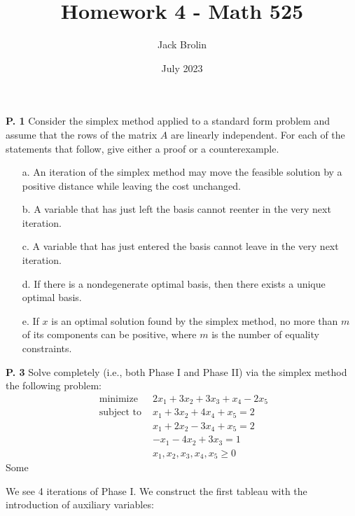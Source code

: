 \documentclass{article}
\title{Homework 4 - Math 525}
\author{Jack Brolin}
\date{July 2023}
\begin{document}
\maketitle

\begin{jacklist}
    \begin{framed} 
    \item [\textbf{P. 1}] Consider the simplex method applied to a standard form problem and assume that the rows of the matrix 
        $A$ are linearly independent. For each of the statements that follow, give either a proof or a counterexample.
        \begin{itemize}
            \item [a.] An iteration of the simplex method may move the feasible solution by a positive distance while leaving 
                the cost unchanged.
            \item [b.] A variable that has just left the basis cannot reenter in the very next iteration.
            \item [c.] A variable that has just entered the basis cannot leave in the very next iteration.
            \item [d.] If there is a nondegenerate optimal basis, then there exists a unique optimal basis.
            \item [e.] If $x$ is an optimal solution found by the simplex method, no more than $m$ of its components can be positive, 
                where $m$ is the number of equality constraints.
        \end{itemize}
    \end{framed}
\newpage
    \begin{framed} 
    \item [\textbf{P. 3}] Solve completely (i.e., both Phase I and Phase II) via the simplex method the following problem: 
    \[ 
        \begin{array}{rc}
        \text { minimize } & 2 x_{1}+3 x_{2}+3 x_{3}+x_{4}-2 x_{5} \\
        \text { subject to } & x_{1}+3 x_{2}+4 x_{4}+x_{5}=2 \\
        & x_{1}+2 x_{2}-3 x_{4}+x_{5}=2 \\
        & -x_{1}-4 x_{2}+3 x_{3}=1 \\
        & x_{1}, x_{2}, x_{3}, x_{4}, x_{5} \geq 0
        \end{array}
    \] Some 
    \end{framed}
    We see 4 iterations of Phase I. We construct the first tableau with the introduction of auxiliary variables: 

\end{jacklist}
\end{document}
